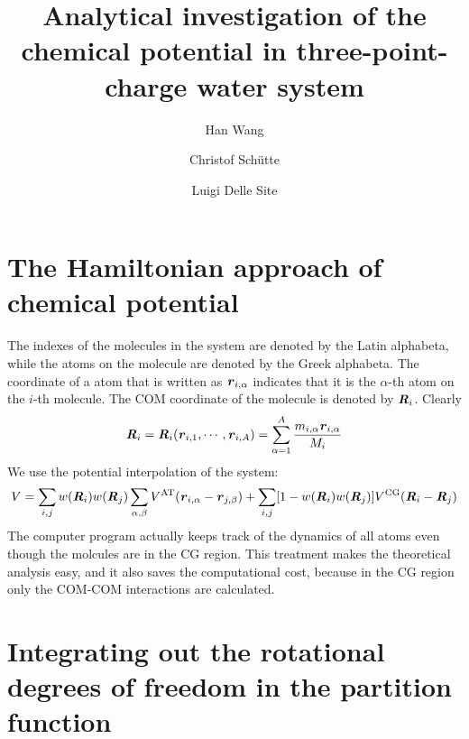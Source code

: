 \documentclass[aip,jcp,a4paper,reprint,onecolumn]{revtex4-1}
\newcommand{\vect}[1]{\textbf{\textit{#1}}}
\newcommand{\AT}{{\textrm{{AT}}}}
\newcommand{\CG}{{\textrm{CG}}}
\begin{document}
\title{Analytical investigation of the chemical potential in three-point-charge water system}
\author{Han Wang}
\author{Christof Sch\"utte}
\author{Luigi Delle Site}

\begin{abstract}
\end{abstract}

\maketitle

\section{The Hamiltonian approach of chemical potential}
The indexes of the molecules in the system are denoted by
the Latin alphabeta, while the atoms on the molecule are denoted
by the Greek alphabeta. The coordinate of a atom that is written
as $\vect r_{i,\alpha}$ indicates that it is the $\alpha$-th atom on
the $i$-th molecule. The COM coordinate of the molecule is denoted
by $\vect R_i$. Clearly
\begin{align}
  \vect R_i = \vect R_i(\vect r_{i,1}, \cdots, \vect r_{i,A}) =
  \sum_{\alpha=1}^A\frac{m_{i,\alpha}\vect r_{i,\alpha}}{M_i}
\end{align}
We use the potential interpolation of the
system:
\begin{align}
  V =
  \sum_{i,j} w(\vect R_i) w(\vect R_j)
  \sum_{\alpha,\beta} V^\AT (\vect r_{i,\alpha} - \vect r_{j,\beta})
  +
  \sum_{i,j}[1- w(\vect R_i) w(\vect R_j)]
  V^\CG(\vect R_i - \vect R_j)
\end{align}
The computer program actually keeps track of the dynamics of all atoms
even though the molcules are in the CG region. This treatment makes the
theoretical analysis easy, and it also saves the computational cost,
because in the CG region only the COM-COM interactions are calculated.

\section{Integrating out the rotational degrees of freedom in the partition function}
\end{document}
